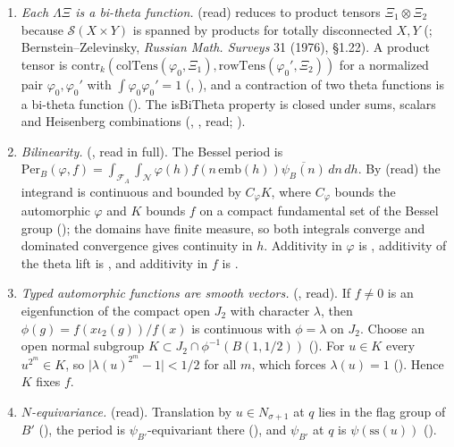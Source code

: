 \documentclass[11pt]{article}
\newcommand{\Sch}{\mathcal S}
\begin{document}
\begin{enumerate}[leftmargin=*,itemsep=3pt]
\item \emph{Each $\Lambda\Xi$ is a bi-theta function.}  (read) reduces to product tensors $\Xi_1\otimes\Xi_2$ because $\Sch(X\times Y)$ is spanned by products for totally disconnected $X,Y$ (; Bernstein--Zelevinsky, \emph{Russian Math. Surveys} 31 (1976), \S1.22). A product tensor is $\mathrm{contr}_k(\mathrm{colTens}(\varphi_0,\Xi_1),\mathrm{rowTens}(\varphi_0',\Xi_2))$ for a normalized pair $\varphi_0,\varphi_0'$ with $\int\varphi_0\varphi_0'=1$ (, ), and a contraction of two theta functions is a bi-theta function (). The isBiTheta property is closed under sums, scalars and Heisenberg combinations (, , read; ).
\item \emph{Bilinearity.}  (, read in full). The Bessel period is $\mathrm{Per}_B(\varphi,f)=\int_{\mathcal F_A}\int_{\mathcal N}\varphi(h)f(n\,\mathrm{emb}(h))\overline{\psi_B(n)}\,dn\,dh$. By  (read) the integrand is continuous and bounded by $C_\varphi K$, where $C_\varphi$ bounds the automorphic $\varphi$ and $K$ bounds $f$ on a compact fundamental set of the Bessel group (); the domains have finite measure, so both integrals converge and dominated convergence gives continuity in $h$. Additivity in $\varphi$ is , additivity of the theta lift is , and additivity in $f$ is .
\item \emph{Typed automorphic functions are smooth vectors.}  (, read). If $f\neq0$ is an eigenfunction of the compact open $J_2$ with character $\lambda$, then $\phi(g)=f(x\iota_2(g))/f(x)$ is continuous with $\phi=\lambda$ on $J_2$. Choose an open normal subgroup $K\subset J_2\cap\phi^{-1}(B(1,1/2))$ (). For $u\in K$ every $u^{2^m}\in K$, so $\lvert\lambda(u)^{2^m}-1\rvert<1/2$ for all $m$, which forces $\lambda(u)=1$ (). Hence $K$ fixes $f$.
\item \emph{$N$-equivariance.}  (read). Translation by $u\in N_{\sigma+1}$ at $q$ lies in the flag group of $B'$ (), the period is $\psi_{B'}$-equivariant there (), and $\psi_{B'}$ at $q$ is $\psi(\mathrm{ss}(u))$ ().

\end{enumerate}
\end{document}
